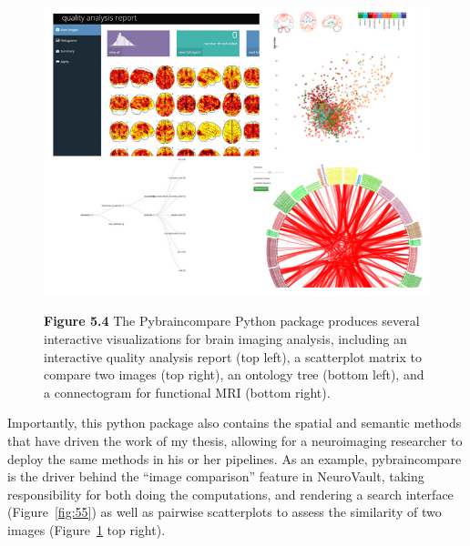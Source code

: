 \documentclass{report}
\begin{document}
\begin{figure}[ht!]
\begin{center}
\includegraphics[width=15cm]{images/figure54.png}
\end{center}
 \textbf{\label{fig:54} Figure 5.4 }{ The Pybraincompare Python package produces several interactive visualizations for brain imaging analysis, including an interactive quality analysis report (top left), a scatterplot matrix to compare two images (top right), an ontology tree (bottom left), and a connectogram for functional MRI (bottom right).}
\end{figure}

Importantly, this python package also contains the spatial and semantic
methods that have driven the work of my thesis, allowing for a
neuroimaging researcher to deploy the same methods in his or her
pipelines. As an example, pybraincompare is the driver behind the
``image comparison'' feature in NeuroVault, taking responsibility for
both doing the computations, and rendering a search interface (Figure~\ref{fig:55}) as well as pairwise scatterplots to assess the similarity of two
images (Figure~\ref{fig:54} top right).
\end{document}
